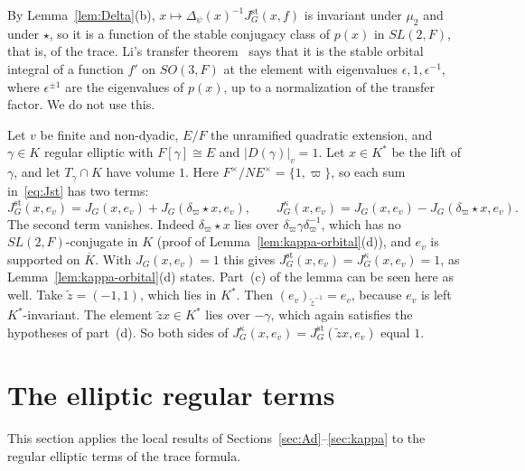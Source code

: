 By Lemma~\ref{lem:Delta}(b), $x\mapsto\Delta_\psi(x)^{-1}J^{\mathrm{st}}_G
(x,f)$ is invariant under $\mu_2$ and under $\star$, so it is a function
of the stable conjugacy class of $p(x)$ in $SL(2,F)$, that is, of the
trace. Li's transfer theorem~\cite{Li11} says that it is the stable
orbital integral of a function $f'$ on $SO(3,F)$ at the element with
eigenvalues $\epsilon,1,\epsilon^{-1}$, where $\epsilon^{\pm1}$ are the
eigenvalues of $p(x)$, up to a normalization of the transfer factor. We
do not use this.

\begin{example}\label{ex:kappa-unram}
Let $v$ be finite and non-dyadic, $E/F$ the unramified quadratic
extension, and $\gamma\in K$ regular elliptic with $F[\gamma]\cong E$ and
$|D(\gamma)|_v=1$. Let $x\in K^*$ be the lift of $\gamma$, and let
$T_\gamma\cap K$ have volume $1$. Here $F^\times/NE^\times=\{1,\varpi\}$,
so each sum in~\eqref{eq:Jst} has two terms:
\[
J^{\mathrm{st}}_G(x,e_v)=J_G(x,e_v)+J_G(\delta_\varpi\star x,e_v),\qquad
J^{\kappa}_G(x,e_v)=J_G(x,e_v)-J_G(\delta_\varpi\star x,e_v).
\]
The second term vanishes. Indeed $\delta_\varpi\star x$ lies over
$\delta_\varpi\gamma\delta_\varpi^{-1}$, which has no $SL(2,F)$-conjugate
in $K$ (proof of Lemma~\ref{lem:kappa-orbital}(d)), and $e_v$ is
supported on $\overline K$. With $J_G(x,e_v)=1$ this gives
$J^{\mathrm{st}}_G(x,e_v)=J^\kappa_G(x,e_v)=1$, as
Lemma~\ref{lem:kappa-orbital}(d) states. Part~(c) of the lemma can be
seen here as well. Take $\tilde z=(-1,1)$, which lies in $K^*$. Then
$(e_v)_{\tilde z^{-1}}=e_v$, because $e_v$ is left $K^*$-invariant. The
element $\tilde zx\in K^*$ lies over $-\gamma$, which again satisfies the
hypotheses of part~(d). So both sides of
$J^\kappa_G(x,e_v)=J^{\mathrm{st}}_G(\tilde zx,e_v)$ equal $1$.
\end{example}


\section{The elliptic regular terms}\label{sec:elliptic-stable}

This section applies the local results of
Sections~\ref{sec:Ad}--\ref{sec:kappa} to the regular elliptic terms of
the trace formula.


